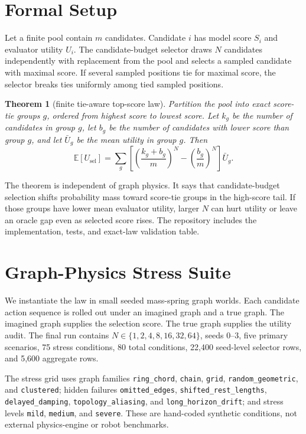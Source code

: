 \documentclass{article}
\newtheorem{theorem}{Theorem}
\newcommand{\utility}{U}
\newcommand{\score}{S}
\newcommand{\selected}{\mathrm{sel}}
\begin{document}
\section{Formal Setup}

Let a finite pool contain $m$ candidates.  Candidate $i$ has model score $\score_i$ and evaluator utility $\utility_i$.  The candidate-budget selector draws \(N\) candidates independently with replacement from the pool and selects a sampled candidate with maximal score.  If several sampled positions tie for maximal score, the selector breaks ties uniformly among tied sampled positions.

\begin{theorem}[finite tie-aware top-score law]
\label{thm:law}
Partition the pool into exact score-tie groups $g$, ordered from highest score to lowest score.  Let $k_g$ be the number of candidates in group $g$, let $b_g$ be the number of candidates with lower score than group $g$, and let $\bar{\utility}_g$ be the mean utility in group $g$.  Then
\begin{equation}
\mathbb{E}[\utility_{\selected}]
= \sum_g \left[
\left(\frac{k_g+b_g}{m}\right)^N
-
\left(\frac{b_g}{m}\right)^N
\right]\bar{\utility}_g .
\end{equation}
\end{theorem}

The theorem is independent of graph physics.  It says that candidate-budget selection shifts probability mass toward score-tie groups in the high-score tail.  If those groups have lower mean evaluator utility, larger $N$ can hurt utility or leave an oracle gap even as selected score rises.  The repository includes the implementation, tests, and exact-law validation table.

\section{Graph-Physics Stress Suite}

We instantiate the law in small seeded mass-spring graph worlds.  Each candidate action sequence is rolled out under an imagined graph and a true graph.  The imagined graph supplies the selection score.  The true graph supplies the utility audit.  The final run contains $N\in\{1,2,4,8,16,32,64\}$, seeds $0$--$3$, five primary scenarios, 75 stress conditions, 80 total conditions, 22,400 seed-level selector rows, and 5,600 aggregate rows.

The stress grid uses graph families \texttt{ring\_chord}, \texttt{chain}, \texttt{grid}, \texttt{random\_geometric}, and \texttt{clustered}; hidden failures \texttt{omitted\_edges}, \texttt{shifted\_rest\_lengths}, \texttt{delayed\_damping}, \texttt{topology\_aliasing}, and \texttt{long\_horizon\_drift}; and stress levels \texttt{mild}, \texttt{medium}, and \texttt{severe}.  These are hand-coded synthetic conditions, not external physics-engine or robot benchmarks.
\end{document}
